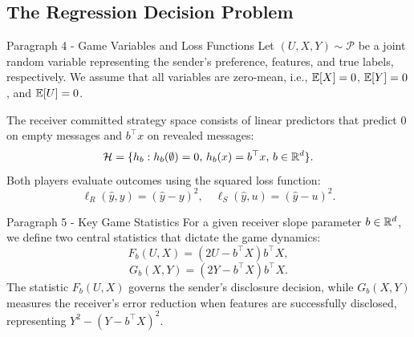 \subsection{The Regression Decision Problem}
\label{sec:regression_decision}

\begin{sourceblock}{Paragraph 4 - Game Variables and Loss Functions}
Let $(U, X, Y) \sim \mathcal{P}$ be a joint random variable representing the sender's preference, features, and true labels, respectively. We assume that all variables are zero-mean, i.e., $\mathbb{E}[X] = 0$, $\mathbb{E}[Y] = 0$, and $\mathbb{E}[U] = 0$. 

The receiver committed strategy space consists of linear predictors that predict $0$ on empty messages and $b^\top x$ on revealed messages:
\begin{equation}
    \mathcal{H} = \{h_b : h_b(\emptyset) = 0, \, h_b(x) = b^\top x, \, b \in \mathbb{R}^d\}.
\end{equation}
Both players evaluate outcomes using the squared loss function:
\begin{equation}
    \ell_R(\hat{y}, y) = (\hat{y} - y)^2, \quad \ell_S(\hat{y}, u) = (\hat{y} - u)^2.
\end{equation}
\end{sourceblock}

\begin{faqblock}
\faqanswers
{}
\end{faqblock}

\begin{sourceblock}{Paragraph 5 - Key Game Statistics}
For a given receiver slope parameter $b \in \mathbb{R}^d$, we define two central statistics that dictate the game dynamics:
\begin{equation}
    \label{eq:Fb_def}
    F_b(U, X) = (2U - b^\top X)b^\top X,
\end{equation}
\begin{equation}
    \label{eq:Gb_def}
    G_b(X, Y) = (2Y - b^\top X)b^\top X.
\end{equation}
The statistic $F_b(U, X)$ governs the sender's disclosure decision, while $G_b(X, Y)$ measures the receiver's error reduction when features are successfully disclosed, representing $Y^2 - (Y - b^\top X)^2$.
\end{sourceblock}

